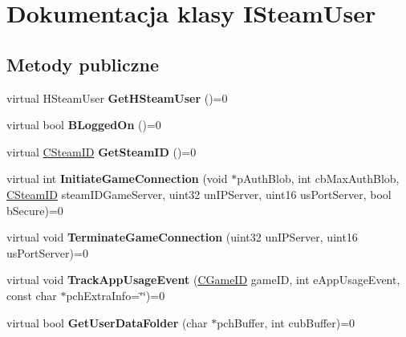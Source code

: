 \hypertarget{class_i_steam_user}{}\section{Dokumentacja klasy I\+Steam\+User}
\label{class_i_steam_user}
\subsection*{Metody publiczne}
\begin{DoxyCompactItemize}
\item 
\mbox{\label{class_i_steam_user_a17e683a53cb649d324d0614bece5a539}} 
virtual H\+Steam\+User {\bfseries Get\+H\+Steam\+User} ()=0
\item 
\mbox{\label{class_i_steam_user_a29e4a5e59dee5867f60732311fad2c4e}} 
virtual bool {\bfseries B\+Logged\+On} ()=0
\item 
\mbox{\label{class_i_steam_user_a5a7659a6147a7bd3c0acf4065c3bed36}} 
virtual \hyperlink{class_c_steam_i_d}{C\+Steam\+ID} {\bfseries Get\+Steam\+ID} ()=0
\item 
\mbox{\label{class_i_steam_user_ab243e44f96ea3070d7973deaa013afbd}} 
virtual int {\bfseries Initiate\+Game\+Connection} (void $\ast$p\+Auth\+Blob, int cb\+Max\+Auth\+Blob, \hyperlink{class_c_steam_i_d}{C\+Steam\+ID} steam\+I\+D\+Game\+Server, uint32 un\+I\+P\+Server, uint16 us\+Port\+Server, bool b\+Secure)=0
\item 
\mbox{\label{class_i_steam_user_a67de2694f5b1abb4b22612ea3a43e46c}} 
virtual void {\bfseries Terminate\+Game\+Connection} (uint32 un\+I\+P\+Server, uint16 us\+Port\+Server)=0
\item 
\mbox{\label{class_i_steam_user_a4f8099764ca59d6557a6a6174faa3883}} 
virtual void {\bfseries Track\+App\+Usage\+Event} (\hyperlink{class_c_game_i_d}{C\+Game\+ID} game\+ID, int e\+App\+Usage\+Event, const char $\ast$pch\+Extra\+Info=\char`\"{}\char`\"{})=0
\item 
\mbox{\label{class_i_steam_user_ad9338e70287a15571c8ffc998e49d338}} 
virtual bool {\bfseries Get\+User\+Data\+Folder} (char $\ast$pch\+Buffer, int cub\+Buffer)=0

\end{DoxyCompactItemize}
